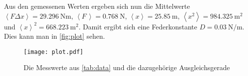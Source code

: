 Aus den gemessenen Werten ergeben sich nun die Mittelwerte $\left< F \Delta x \right> = \SI{29.296}{\newton\meter}$, $\left< F \, \right> = \SI{0.768}{\newton}$, $\left< x \right> = \SI{25.85}{\meter}$, $\left< x^2 \right> = \SI{984.325}{\meter\squared}$ und $\left< x \right> ^2 = \SI{668.223}{\meter\squared}$.
Damit ergibt sich eine Federkonstante $D=\SI{0.03}{\newton\per\meter}$.
Dies kann man in \autoref{fig:plot} sehen.

\begin{figure}
  \centering
  \texttt{[image: plot.pdf]}
  \caption{Die Messwerte aus \autoref{tab:data} und die dazugehörige Ausgleichsgerade}
  \label{fig:plot}
\end{figure}

